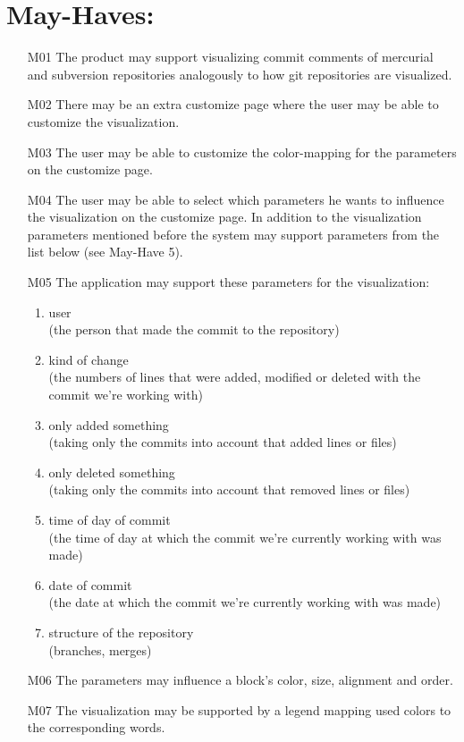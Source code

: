 \documentclass[12pt]{scrartcl}
\begin{document}
\section{May-Haves:}
\begin{enumerate}
\item [M01] The product may support visualizing commit comments of mercurial and
	subversion repositories analogously to how git repositories are
	visualized.
\item [M02] There may be an extra customize page where the user may be able to customize the visualization.
\item [M03] The user may be able to customize the color-mapping for the parameters on the customize page.
\item [M04] The user may be able to select which parameters he wants to influence the visualization on the customize page. In addition to the visualization parameters mentioned before the system may support parameters from the list below (see May-Have 5).
\item [M05] The application may support these parameters for the visualization:
\begin{enumerate}
\item user\\
(the person that made the commit to the repository)
\item kind of change\\  
(the numbers of lines that were added, modified or deleted with the commit we're working with)
\item only added something \\
(taking only the commits into account that added lines or files)
\item only deleted something\\
(taking only the commits into account that removed lines or files)
\item time of day of commit\\
(the time of day at which the commit we're currently working with was made)
\item date of commit\\
(the date at which the commit we're currently working with was made)
\item structure of the repository\\
(branches, merges)
\end{enumerate}
\item [M06] The parameters may influence a block's color, size, alignment and order.
\item [M07] The visualization may be supported by a legend mapping used colors to the corresponding words.

\end{enumerate}
\end{document}
